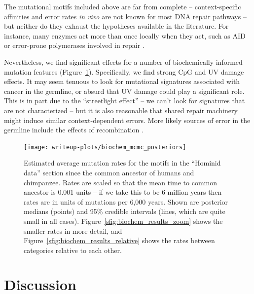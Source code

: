 \documentclass{article}
\theoremstyle{plain}
\theoremstyle{definition}
\begin{document}
The mutational motifs included above are far from complete
-- context-specific affinities and error rates \textit{in vivo}
are not known for most DNA repair pathways --
but neither do they exhaust the hypotheses available in the literature.
For instance, many enzymes act more than once locally when they act,
such as AID \citep{senavirathne2015activationinduced} or error-prone polymerases involved in repair \citep{maul2016polymerase}.

Nevertheless, we find significant effects for a number of biochemically-informed mutation features (Figure~\ref{fig:biochem_results}).
Specifically, we find strong CpG and UV damage effects.
It may seem tenuous to look for mutational signatures associated with cancer in the germline,
or absurd that UV damage could play a significant role.
This is in part due to the ``streetlight effect'' --
we can't look for signatures that are not characterized --
but it is also reasonable that shared repair machinery might induce similar context-dependent errors.
More likely sources of error in the germline include the effects of recombination
\citep{arbeithuber2015crossovers,myers2010drive}.


\begin{figure}
    \begin{center}
        \texttt{[image: writeup-plots/biochem\_mcmc\_posteriors]}
    \end{center}
    \caption{
        Estimated average mutation rates
        for the motifs in the ``Hominid data'' section
        since the common ancestor of humans and chimpanzee.
        Rates are scaled so that the mean time to common ancestor is 0.001 units --
        if we take this to be 6 million years \citep{scally2012insights,langergraber2012generation}
        then rates are in units of mutations per 6,000 years.
        Shown are posterior medians (points) and 95\% credible intervals (lines, which are quite small in all cases).
        Figure~\ref{sfig:biochem_results_zoom} shows the smaller rates in more detail,
        and Figure~\ref{sfig:biochem_results_relative} shows the rates between categories relative to each other.
        \label{fig:biochem_results}}
\end{figure}

\section{Discussion}
\end{document}
